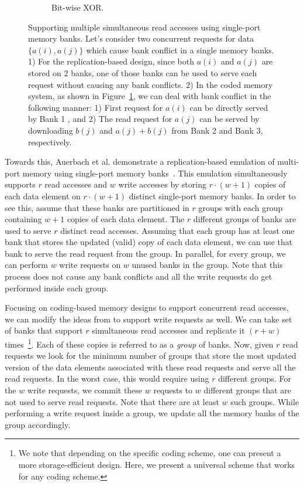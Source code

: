 \begin{figure}[t!]
\begin{subfigure}{0.43\linewidth}
  \caption{Bit-wise XOR.}
  \label{fig:emulation_ec}
\end{subfigure}
\caption{Supporting multiple simultaneous read accesses using single-port memory banks. Let's consider two concurrent requests for data  $\{a(i), a(j)\}$ which cause bank conflict in a single memory banks. 1)  For the replication-based design, since both $a(i)$ and $a(j)$ are stored on $2$ banks, one of those banks can be used to serve each request without causing any bank conflicts. 2) In the coded memory system, as shown in Figure~\ref{fig:emulation_ec}, we can deal with bank conflict in the following manner:  1) First request for $a(i)$ can be directly served by Bank 1 , and 2) The read request for $a(j)$ can be served by downloading $b(j)$ and $a(j) + b(j)$ from Bank 2 and Bank 3, respectively.}
\label{fig:emulation}
\end{figure}

Towards this, Auerbach et al. demonstrate a replication-based emulation of multi-port memory using single-port memory banks~\cite{ACP88}. This emulation simultaneously supports $r$ read accesses and $w$ write accesses by storing $r\cdot(w + 1)$ copies of each data element on $r\cdot(w+1)$ distinct single-port memory banks. In order to see this, assume that these banks are partitioned in $r$ groups with each group containing $w + 1$ copies of each data element. The $r$ different groups of banks are used to serve $r$ distinct read accesses. Assuming that each group has at least one bank that stores the updated (valid) copy of each data element, we can use that bank to serve the read request from the group. In parallel, for every group, we can perform $w$ write requests on $w$ unused banks in the group. Note that this process does not cause any bank conflicts and all the write requests do get performed inside each group. 

Focusing on coding-based memory designs to support concurrent read accesses, we can modify the ideas from \cite{ACP88} to support write requests as well. We can take set of banks that support $r$ simultaneous read accesses and replicate it $(r+w)$ times~\footnote{We note that depending on the specific coding scheme, one can present a more storage-efficient design. Here, we present a universal scheme that works for any coding scheme.}. Each of these copies is referred to as a \textit{group} of banks. Now, given $r$ read requests we look for the minimum number of groups that store the most updated version of the data elements associated with these read requests and serve all the read requests. In the worst case, this would require using $r$ different groups. For the $w$ write requests, we commit these $w$ requests to $w$ different groups that are not used to serve read requests. Note that there are at least $w$ such groups. While performing a write request inside a group, we update all the memory banks of the group accordingly. 

